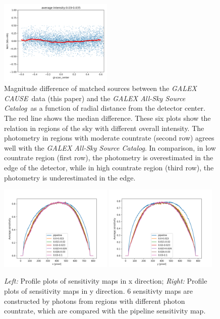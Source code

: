 \documentclass[12pt, preprint]{aastex}
\newcommand{\project}[1]{\textsl{#1}}
\newcommand{\asc}{\project{GALEX All-Sky Source Catalog}}
\newcommand{\cause}{\project{GALEX CAUSE}}
\begin{document}
\begin{figure}[p]
\begin{center}
\includegraphics[width=0.48\textwidth]{figures/cr6}
\end{center}
\caption{
  \label{countrate}
  Magnitude difference of matched sources between the \cause\ data (this paper) and the \asc\ as a function of radial distance from the detector center. 
  The red line shows the median difference.
  These six plots show the relation in regions of the sky with different overall intensity.
  The photometry in regions with moderate countrate (second row) agrees well with the \asc.
  In comparison, in low countrate region (first row), the photometry is overestimated in the edge of the detector, while in high countrate region (third row), the photometry is underestimated in the edge.
}
\end{figure}

\begin{figure}[p]
\begin{center}
\includegraphics[width=0.48\textwidth]{figures/profile_x}
\includegraphics[width=0.48\textwidth]{figures/profile_y}
\end{center}
\caption{
  \label{flat-profile}
  \emph{Left:} Profile plots of sensitivity maps in x direction;
  \emph{Right:} Profile plots of sensitivity maps in y direction.
  6 sensitivty maps are constructed by photons from regions with different photon countrate, which are compared with the pipeline sensitivity map.
}
\end{figure}
\end{document}
